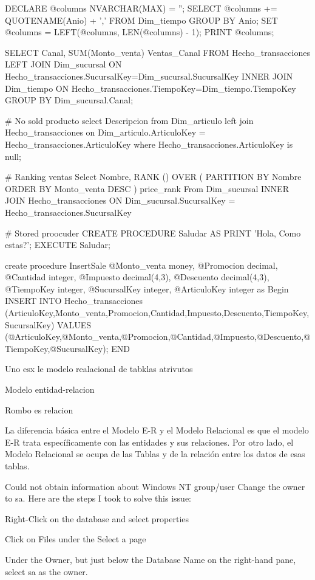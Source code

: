 DECLARE  @columns NVARCHAR(MAX) = '';
SELECT @columns += QUOTENAME(Anio) + ',' FROM Dim_tiempo GROUP BY Anio;
SET @columns = LEFT(@columns, LEN(@columns) - 1);
PRINT @columns;

SELECT Canal, SUM(Monto_venta) Ventas_Canal FROM Hecho_transacciones LEFT JOIN Dim_sucursal ON Hecho_transacciones.SucursalKey=Dim_sucursal.SucursalKey INNER JOIN Dim_tiempo ON Hecho_transacciones.TiempoKey=Dim_tiempo.TiempoKey  GROUP BY Dim_sucursal.Canal;

# No sold producto
select Descripcion from Dim_articulo left join Hecho_transacciones on Dim_articulo.ArticuloKey = Hecho_transacciones.ArticuloKey where Hecho_transacciones.ArticuloKey is null;

# Ranking ventas 
Select Nombre, RANK () OVER ( PARTITION BY Nombre ORDER BY Monto_venta DESC ) price_rank From Dim_sucursal INNER JOIN Hecho_transacciones ON Dim_sucursal.SucursalKey = Hecho_transacciones.SucursalKey 


# Stored proocuder
CREATE PROCEDURE  Saludar AS PRINT 'Hola, Como estas?';
EXECUTE Saludar;

create procedure InsertSale
@Monto_venta money,
@Promocion decimal,
@Cantidad integer,
@Impuesto decimal(4,3),
@Descuento decimal(4,3),
@TiempoKey integer,
@SucursalKey integer,
@ArticuloKey integer
as
Begin
INSERT INTO Hecho_transacciones (ArticuloKey,Monto_venta,Promocion,Cantidad,Impuesto,Descuento,TiempoKey,SucursalKey) VALUES (@ArticuloKey,@Monto_venta,@Promocion,@Cantidad,@Impuesto,@Descuento,@TiempoKey,@SucursalKey);
END

Uno esx le modelo realacional de tabklas atrivutos

Modelo entidad-relacion

Rombo es relacion


La diferencia básica entre el Modelo E-R y el Modelo Relacional es que el modelo E-R trata específicamente con las entidades y sus relaciones. Por otro lado, el Modelo Relacional se ocupa de las Tablas y de la relación entre los datos de esas tablas.




Could not obtain information about Windows NT group/user
Change the owner to sa. Here are the steps I took to solve this issue:

Right-Click on the database and select properties

Click on Files under the Select a page

Under the Owner, but just below the Database Name on the right-hand pane, select sa as the owner.


